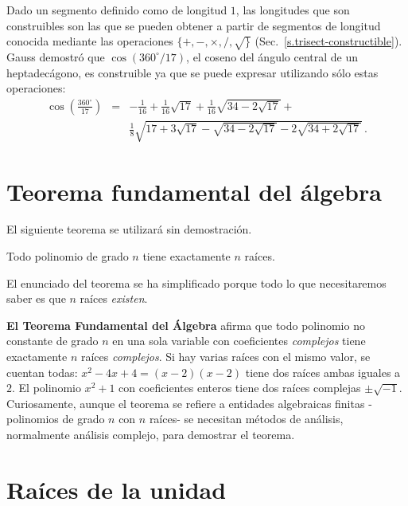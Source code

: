 Dado un segmento definido como de longitud $1$, las longitudes que son construibles son las que se pueden obtener a partir de segmentos de longitud conocida mediante las operaciones $\{+,-,\times,/,\surd\}$ (Sec.~\ref{s.trisect-constructible}). Gauss demostró que $\cos(360^\circ/17)$, el coseno del ángulo central de un heptadecágono, es construible ya que se puede expresar utilizando sólo estas operaciones:
\begin{eqnarray*}
\cos\left(\frac{360^\circ}{17}\right) &=& 
-\frac{1}{16}+\frac{1}{16}\sqrt{17} + 
     \frac{1}{16}\sqrt{34-2\sqrt{17}}
    + \\
    &&
     \frac{1}{8}\sqrt{
     17+3\sqrt{17} - 
     \sqrt{34-2\sqrt{17}}
   -2
     \sqrt{34+2\sqrt{17}}
   }\,.
\end{eqnarray*}

\section{Teorema fundamental del álgebra}\label{s.fundamental}

El siguiente teorema se utilizará sin demostración.

\begin{theorem}\label{thm.fundamental} Todo polinomio de grado $n$ tiene exactamente $n$ raíces.
\end{theorem}

El enunciado del teorema se ha simplificado porque todo lo que necesitaremos saber es que $n$ raíces \emph{existen}.

\begin{advanced}
\textbf{El Teorema Fundamental del Álgebra} afirma que todo polinomio no constante de grado $n$ en una sola variable con coeficientes \emph{complejos}  tiene exactamente $n$ raíces \emph{complejos}.
Si hay varias raíces con el mismo valor, se cuentan todas: $x^2-4x+4=(x-2)(x-2)$ tiene dos raíces ambas iguales a $2$.
El polinomio $x^2+1$ con coeficientes enteros tiene dos raíces complejas $\pm\sqrt{-1}$.
Curiosamente, aunque el teorema se refiere a entidades algebraicas finitas -polinomios de grado $n$ con $n$ raíces- se necesitan métodos de análisis, normalmente análisis complejo, para demostrar el teorema.
\end{advanced}

\section{Raíces de la unidad}\label{s.roots}

